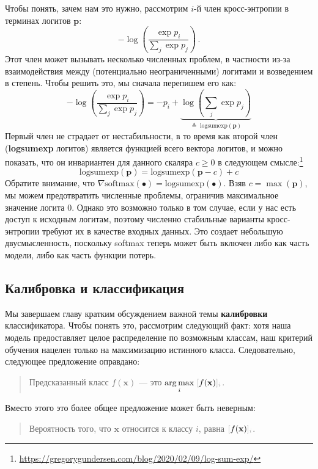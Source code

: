 Чтобы понять, зачем нам это нужно, рассмотрим $i$-й член кросс-энтропии в терминах логитов $\mathbf{p}$:
%
$$
- \log\left( \frac{\exp{p_i}}{\sum_j \exp{p_j}} \right) \,.
$$
%
Этот член может вызывать несколько численных проблем, в частности из-за взаимодействия между (потенциально неограниченными) логитами и возведением в степень. Чтобы решить это, мы сначала перепишем его как:
%
$$
- \log\left( \frac{\exp{p_i}}{\sum_j \exp{p_j}} \right) = -p_i + \underbrace{\log\left(\sum_j \exp p_j\right)}_{\triangleq \; \text{logsumexp}(\mathbf{p})}
$$
%
Первый член не страдает от нестабильности, в то время как второй член (\textbf{logsumexp} логитов) является функцией всего вектора логитов, и можно показать, что он инвариантен для данного скаляра $c \ge 0$ в следующем смысле:\footnote{\url{https://gregorygundersen.com/blog/2020/02/09/log-sum-exp/}}
%
$$
\text{logsumexp}(\mathbf{p})=\text{logsumexp}(\mathbf{p} - c) +c
$$
%
Обратите внимание, что $\nabla \text{softmax}(\bullet) = \text{logsumexp}(\bullet)$. Взяв $c = \max(\mathbf{p})$, мы можем предотвратить численные проблемы, ограничив максимальное значение логита $0$. Однако это возможно только в том случае, если у нас есть доступ к исходным логитам, поэтому численно стабильные варианты кросс-энтропии требуют их в качестве входных данных. Это создает небольшую двусмысленность, поскольку softmax теперь может быть включен либо как часть модели, либо как часть функции потерь.

\subsection{Калибровка и классификация}

Мы завершаем главу кратким обсуждением важной темы \textbf{калибровки} классификатора. Чтобы понять это, рассмотрим следующий факт: хотя наша модель предоставляет целое распределение по возможным классам, наш критерий обучения нацелен только на максимизацию истинного класса. Следовательно, следующее предложение оправдано:

\begin{quote}Предсказанный класс $f(\mathbf{x})$ — это $\underset{i}{\arg\max} \; \idx{f(\mathbf{x})}{i}$.\end{quote}

Вместо этого это более общее предложение может быть неверным:

\begin{quote} Вероятность того, что $\mathbf{x}$ относится к классу $i$, равна $\idx{f(\mathbf{x})}{i}$.\end{quote}

